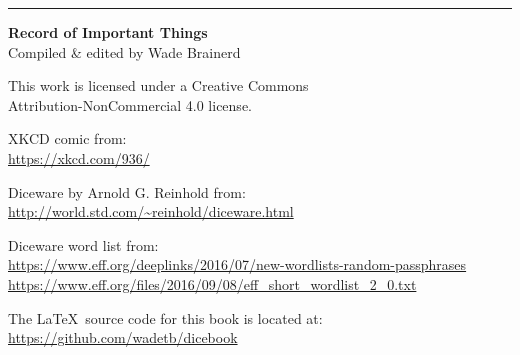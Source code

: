 

\vfill
\rule{\textwidth}{.5pt}

\textbf{Record of Important Things} \ccbync \\
\scriptsize
Compiled \& edited by Wade Brainerd

This work is licensed under a Creative Commons \\ Attribution-NonCommercial 4.0 license.

XKCD comic from: \\
\url{https://xkcd.com/936/}

Diceware by Arnold G. Reinhold from: \\
\url{http://world.std.com/~reinhold/diceware.html}

Diceware word list from: \\ \url{https://www.eff.org/deeplinks/2016/07/new-wordlists-random-passphrases} \\
\url{https://www.eff.org/files/2016/09/08/eff_short_wordlist_2_0.txt}

The \LaTeX\ source code for this book is located at: \\ \url{https://github.com/wadetb/dicebook}

